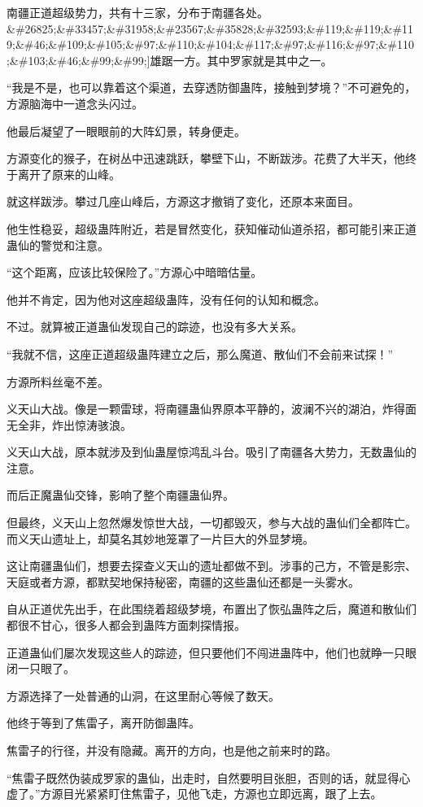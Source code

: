 \begin{this_body}
南疆正道超级势力，共有十三家，分布于南疆各处。\&\#26825;\&\#33457;\&\#31958;\&\#23567;\&\#35828;\&\#32593;\&\#119;\&\#119;\&\#119;\&\#46;\&\#109;\&\#105;\&\#97;\&\#110;\&\#104;\&\#117;\&\#97;\&\#116;\&\#97;\&\#110;\&\#103;\&\#46;\&\#99;\&\#99;]雄踞一方。其中罗家就是其中之一。

“我是不是，也可以靠着这个渠道，去穿透防御蛊阵，接触到梦境？”不可避免的，方源脑海中一道念头闪过。

他最后凝望了一眼眼前的大阵幻景，转身便走。

方源变化的猴子，在树丛中迅速跳跃，攀壁下山，不断跋涉。花费了大半天，他终于离开了原来的山峰。

就这样跋涉。攀过几座山峰后，方源这才撤销了变化，还原本来面目。

他生性稳妥，超级蛊阵附近，若是冒然变化，获知催动仙道杀招，都可能引来正道蛊仙的警觉和注意。

“这个距离，应该比较保险了。”方源心中暗暗估量。

他并不肯定，因为他对这座超级蛊阵，没有任何的认知和概念。

不过。就算被正道蛊仙发现自己的踪迹，也没有多大关系。

“我就不信，这座正道超级蛊阵建立之后，那么魔道、散仙们不会前来试探！”

方源所料丝毫不差。

义天山大战。像是一颗雷球，将南疆蛊仙界原本平静的，波澜不兴的湖泊，炸得面无全非，炸出惊涛骇浪。

义天山大战，原本就涉及到仙蛊屋惊鸿乱斗台。吸引了南疆各大势力，无数蛊仙的注意。

而后正魔蛊仙交锋，影响了整个南疆蛊仙界。

但最终，义天山上忽然爆发惊世大战，一切都毁灭，参与大战的蛊仙们全都阵亡。而义天山遗址上，却莫名其妙地笼罩了一片巨大的外显梦境。

这让南疆蛊仙们，想要去探查义天山的遗址都做不到。涉事的己方，不管是影宗、天庭或者方源，都默契地保持秘密，南疆的这些蛊仙还都是一头雾水。

自从正道优先出手，在此围绕着超级梦境，布置出了恢弘蛊阵之后，魔道和散仙们都很不甘心，很多人都会到蛊阵方面刺探情报。

正道蛊仙们屡次发现这些人的踪迹，但只要他们不闯进蛊阵中，他们也就睁一只眼闭一只眼了。

方源选择了一处普通的山洞，在这里耐心等候了数天。

他终于等到了焦雷子，离开防御蛊阵。

焦雷子的行径，并没有隐藏。离开的方向，也是他之前来时的路。

“焦雷子既然伪装成罗家的蛊仙，出走时，自然要明目张胆，否则的话，就显得心虚了。”方源目光紧紧盯住焦雷子，见他飞走，方源也立即远离，跟了上去。


\end{this_body}
